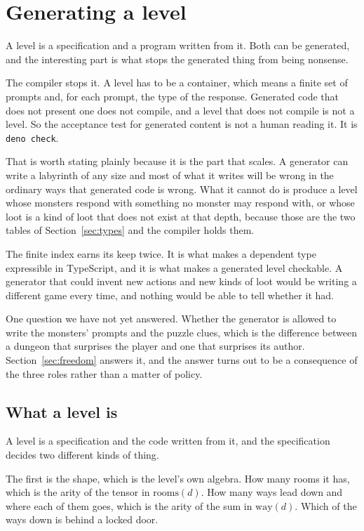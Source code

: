 \documentclass[11pt,a4paper]{article}
\begin{document}
\section{Generating a level}
\label{sec:gen}

A level is a specification and a program written from it. Both can be generated, and the
interesting part is what stops the generated thing from being nonsense.

The compiler stops it. A level has to be a container, which means a finite set of prompts and,
for each prompt, the type of the response. Generated code that does not present one
does not compile, and a level that does not compile is not a level. So the acceptance test for
generated content is not a human reading it. It is \texttt{deno check}.

That is worth stating plainly because it is the part that scales. A generator can write a
labyrinth of any size and most of what it writes will be wrong in the ordinary ways that
generated code is wrong. What it cannot do is produce a level whose monsters respond with
something no monster may respond with, or whose loot is a kind of loot that does not exist at that
depth, because those are the two tables of Section~\ref{sec:types} and the compiler holds them.

\begin{sectionbox}
The finite index earns its keep twice. It is what makes a dependent type expressible in
TypeScript, and it is what makes a generated level checkable. A generator that could invent new
actions and new kinds of loot would be writing a different game every time, and nothing would be
able to tell whether it had.
\end{sectionbox}

One question we have not yet answered. Whether the generator is allowed to write the monsters'
prompts and the puzzle clues, which is the difference between a dungeon that surprises the player
and one that surprises its author. Section~\ref{sec:freedom} answers it, and the answer turns out
to be a consequence of the three roles rather than a matter of policy.

\subsection{What a level is}

A level is a specification and the code written from it, and the specification decides two
different kinds of thing.

The first is the shape, which is the level's own algebra. How many rooms it has, which is the
arity of the tensor in $\text{rooms}(d)$. How many ways lead down and where each of them goes,
which is the arity of the sum in $\text{way}(d)$. Which of the ways down is behind a locked door.
\end{document}
